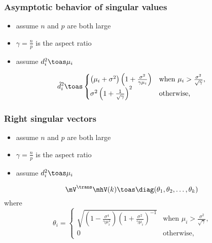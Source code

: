 \documentclass{beamer}
\begin{document}
\begin{frame}
  \frametitle{Asymptotic behavior of singular values}
  \begin{itemize}
  \item assume $n$ and $p$ are both large
  \item $\gamma = \frac{n}{p}$ is the aspect ratio
  \item assume $d_i^2 \toas \mu_i$
  \end{itemize} 
  \begin{theorem}
    \[
      \hat d_i^2
      \toas
        \begin{cases}
            \left( \mu_i + \sigma^2 \right)
            \left( 1 + \frac{\sigma^2}{\gamma \mu_i} \right)
                &\text{when $\mu_i > \frac{\sigma^2}{\sqrt{\gamma}}$}, \\
            \sigma^2 \left( 1 + \frac{1}{\sqrt{\gamma}} \right)^2
                &\text{otherwise,}
        \end{cases}
    \]
  \end{theorem} 
\end{frame}

\begin{frame}
  \frametitle{Right singular vectors}
  \begin{itemize}
  \item assume $n$ and $p$ are both large
  \item $\gamma = \frac{n}{p}$ is the aspect ratio
  \item assume $d_i^2 \toas \mu_i$
  \end{itemize}
  \begin{theorem}
    \[
      \mV^\trans \mhV(k)
      \toas
      \diag(\theta_1, \theta_2, \ldots, \theta_k)
    \]
    where
    \[
       \theta_i =  \begin{cases}
            \sqrt{ 
                \left( 1 - \frac{\sigma^4}{ \gamma \mu_i^2} \right) 
                \left( 1 + \frac{\sigma^2}{ \gamma \mu_i  } \right)^{-1} }
            &\text{when $\mu_i > \frac{\sigma^2}{\sqrt{\gamma}}$,} \\
            0
            &\text{otherwise,}
        \end{cases} 
    \]
  \end{theorem}
\end{frame}
\end{document}
